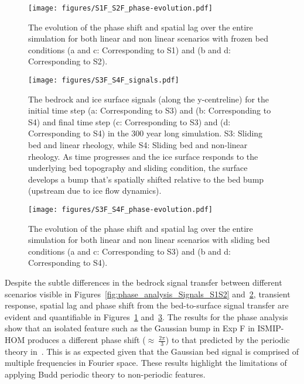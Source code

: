 \begin{figure}[H]
    \texttt{[image: figures/S1F\_S2F\_phase-evolution.pdf]}
    \caption{The evolution of the phase shift and spatial lag over the entire simulation for both linear and non linear scenarios with frozen bed conditions (a and c: Corresponding to S1) and (b and d: Corresponding to S2).}
    \label{fig:phase_analysis_Evolution_Plots_S1S2}
\end{figure}
\newpage
\begin{figure}[H]
    \texttt{[image: figures/S3F\_S4F\_signals.pdf]}
    \caption{The bedrock and ice surface signals (along the y-centreline) for the initial time step (a: Corresponding to S3) and (b: Corresponding to S4) and final time step (c: Corresponding to S3) and (d: Corresponding to S4) in the 300 year long simulation. S3: Sliding bed and linear rheology, while S4: Sliding bed and non-linear rheology. As time progresses and the ice surface responds to the underlying bed topography and sliding condition, the surface develops a bump that's spatially shifted relative to the bed bump (upstream due to ice flow dynamics).}
    \label{fig:phase_analysis_Signals_S3S4}
\end{figure}
\begin{figure}[H]
    \texttt{[image: figures/S3F\_S4F\_phase-evolution.pdf]}
    \caption{The evolution of the phase shift and spatial lag over the entire simulation for both linear and non linear scenarios with sliding bed conditions (a and c: Corresponding to S3) and (b and d: Corresponding to S4).}
    \label{fig:phase_analysis_Evolution_Plots_S3S4}
\end{figure}
Despite the subtle differences in the bedrock signal transfer between different scenarios visible in Figures~\ref{fig:phase_analysis_Signals_S1S2} and~\ref{fig:phase_analysis_Signals_S3S4}, transient response, spatial lag and phase shift from the bed-to-surface signal transfer are evident and quantifiable in Figures~\ref{fig:phase_analysis_Evolution_Plots_S1S2} and~\ref{fig:phase_analysis_Evolution_Plots_S3S4}.
The results for the phase analysis show that an isolated feature such as the Gaussian bump in Exp F in ISMIP-HOM produces a different phase shift ($\approx~\frac{2\pi}{3}$) to that predicted by the periodic theory in~\cite{Budd_1970}. This is as expected given that the Gaussian bed signal is comprised of multiple frequencies in Fourier space. These results highlight the limitations of applying Budd periodic theory to non-periodic features.

